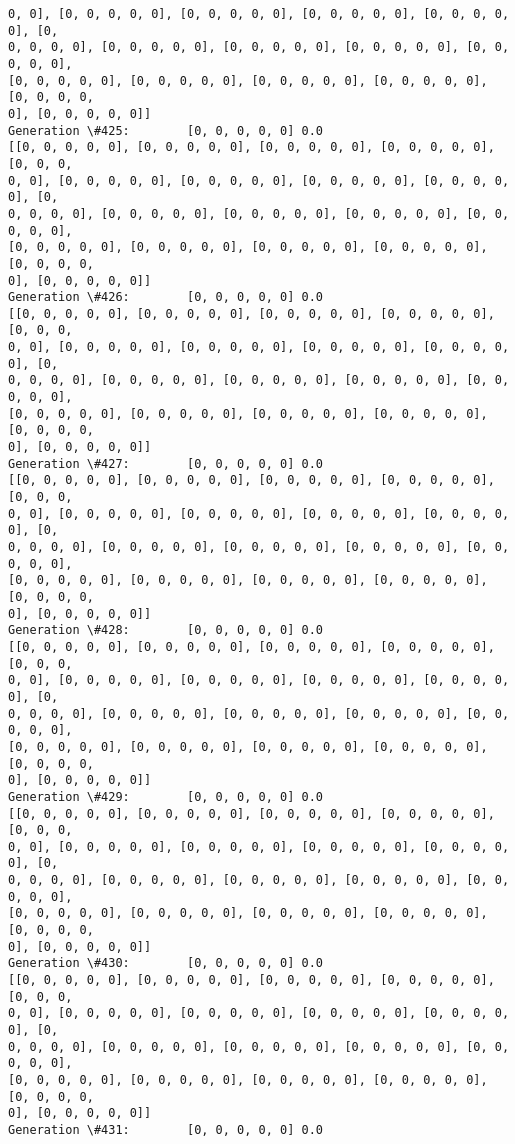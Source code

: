 \documentclass[11pt]{article}
\begin{document}
\begin{Verbatim}[commandchars=\\\{\}]
0, 0], [0, 0, 0, 0, 0], [0, 0, 0, 0, 0], [0, 0, 0, 0, 0], [0, 0, 0, 0, 0], [0,
0, 0, 0, 0], [0, 0, 0, 0, 0], [0, 0, 0, 0, 0], [0, 0, 0, 0, 0], [0, 0, 0, 0, 0],
[0, 0, 0, 0, 0], [0, 0, 0, 0, 0], [0, 0, 0, 0, 0], [0, 0, 0, 0, 0], [0, 0, 0, 0,
0], [0, 0, 0, 0, 0]]
Generation \#425:        [0, 0, 0, 0, 0] 0.0
[[0, 0, 0, 0, 0], [0, 0, 0, 0, 0], [0, 0, 0, 0, 0], [0, 0, 0, 0, 0], [0, 0, 0,
0, 0], [0, 0, 0, 0, 0], [0, 0, 0, 0, 0], [0, 0, 0, 0, 0], [0, 0, 0, 0, 0], [0,
0, 0, 0, 0], [0, 0, 0, 0, 0], [0, 0, 0, 0, 0], [0, 0, 0, 0, 0], [0, 0, 0, 0, 0],
[0, 0, 0, 0, 0], [0, 0, 0, 0, 0], [0, 0, 0, 0, 0], [0, 0, 0, 0, 0], [0, 0, 0, 0,
0], [0, 0, 0, 0, 0]]
Generation \#426:        [0, 0, 0, 0, 0] 0.0
[[0, 0, 0, 0, 0], [0, 0, 0, 0, 0], [0, 0, 0, 0, 0], [0, 0, 0, 0, 0], [0, 0, 0,
0, 0], [0, 0, 0, 0, 0], [0, 0, 0, 0, 0], [0, 0, 0, 0, 0], [0, 0, 0, 0, 0], [0,
0, 0, 0, 0], [0, 0, 0, 0, 0], [0, 0, 0, 0, 0], [0, 0, 0, 0, 0], [0, 0, 0, 0, 0],
[0, 0, 0, 0, 0], [0, 0, 0, 0, 0], [0, 0, 0, 0, 0], [0, 0, 0, 0, 0], [0, 0, 0, 0,
0], [0, 0, 0, 0, 0]]
Generation \#427:        [0, 0, 0, 0, 0] 0.0
[[0, 0, 0, 0, 0], [0, 0, 0, 0, 0], [0, 0, 0, 0, 0], [0, 0, 0, 0, 0], [0, 0, 0,
0, 0], [0, 0, 0, 0, 0], [0, 0, 0, 0, 0], [0, 0, 0, 0, 0], [0, 0, 0, 0, 0], [0,
0, 0, 0, 0], [0, 0, 0, 0, 0], [0, 0, 0, 0, 0], [0, 0, 0, 0, 0], [0, 0, 0, 0, 0],
[0, 0, 0, 0, 0], [0, 0, 0, 0, 0], [0, 0, 0, 0, 0], [0, 0, 0, 0, 0], [0, 0, 0, 0,
0], [0, 0, 0, 0, 0]]
Generation \#428:        [0, 0, 0, 0, 0] 0.0
[[0, 0, 0, 0, 0], [0, 0, 0, 0, 0], [0, 0, 0, 0, 0], [0, 0, 0, 0, 0], [0, 0, 0,
0, 0], [0, 0, 0, 0, 0], [0, 0, 0, 0, 0], [0, 0, 0, 0, 0], [0, 0, 0, 0, 0], [0,
0, 0, 0, 0], [0, 0, 0, 0, 0], [0, 0, 0, 0, 0], [0, 0, 0, 0, 0], [0, 0, 0, 0, 0],
[0, 0, 0, 0, 0], [0, 0, 0, 0, 0], [0, 0, 0, 0, 0], [0, 0, 0, 0, 0], [0, 0, 0, 0,
0], [0, 0, 0, 0, 0]]
Generation \#429:        [0, 0, 0, 0, 0] 0.0
[[0, 0, 0, 0, 0], [0, 0, 0, 0, 0], [0, 0, 0, 0, 0], [0, 0, 0, 0, 0], [0, 0, 0,
0, 0], [0, 0, 0, 0, 0], [0, 0, 0, 0, 0], [0, 0, 0, 0, 0], [0, 0, 0, 0, 0], [0,
0, 0, 0, 0], [0, 0, 0, 0, 0], [0, 0, 0, 0, 0], [0, 0, 0, 0, 0], [0, 0, 0, 0, 0],
[0, 0, 0, 0, 0], [0, 0, 0, 0, 0], [0, 0, 0, 0, 0], [0, 0, 0, 0, 0], [0, 0, 0, 0,
0], [0, 0, 0, 0, 0]]
Generation \#430:        [0, 0, 0, 0, 0] 0.0
[[0, 0, 0, 0, 0], [0, 0, 0, 0, 0], [0, 0, 0, 0, 0], [0, 0, 0, 0, 0], [0, 0, 0,
0, 0], [0, 0, 0, 0, 0], [0, 0, 0, 0, 0], [0, 0, 0, 0, 0], [0, 0, 0, 0, 0], [0,
0, 0, 0, 0], [0, 0, 0, 0, 0], [0, 0, 0, 0, 0], [0, 0, 0, 0, 0], [0, 0, 0, 0, 0],
[0, 0, 0, 0, 0], [0, 0, 0, 0, 0], [0, 0, 0, 0, 0], [0, 0, 0, 0, 0], [0, 0, 0, 0,
0], [0, 0, 0, 0, 0]]
Generation \#431:        [0, 0, 0, 0, 0] 0.0

\end{Verbatim}
\end{document}
